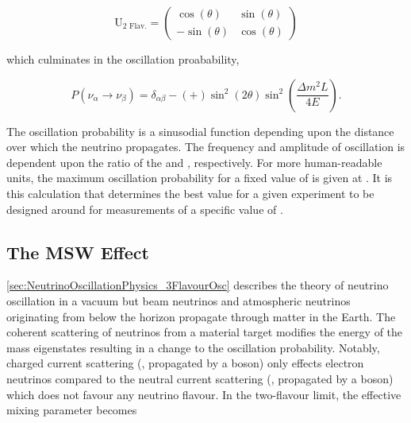 \begin{equation}
  \label{eq:NeutrinoOscillationPhysics_PMNS_2Flavour}
  \mathrm{U_{\text{2 Flav.}}} = \begin{pmatrix} \cos(\theta) & \sin(\theta) \\ -\sin(\theta) & \cos(\theta) \end{pmatrix}
\end{equation}

which culminates in the oscillation proabability,

\begin{equation}
  \label{eq:NeutrinoOscillationPhysics_PMNS_2FlavourOscProb}
  P(\nu_{\alpha} \rightarrow \nu_{\beta}) = \delta_{\alpha \beta} - \left( + \right) \sin^{2} \left( 2\theta \right) \sin^2 \left( \frac{\Delta m^{2} L}{4E} \right).
\end{equation}

The oscillation probability is a sinusodial function depending upon the distance over which the neutrino propagates. The frequency and amplitude of oscillation is dependent upon the ratio of the  and , respectively. For more human-readable units, the maximum oscillation probability for a fixed value of \quickmath{\theta} is given at . It is this calculation that determines the best  value for a given experiment to be designed around for measurements of a specific value of .

\subsection{The MSW Effect}
\label{sec:NeutrinoOscillationPhysics_MSW}

\autoref{sec:NeutrinoOscillationPhysics_3FlavourOsc} describes the theory of neutrino oscillation in a vacuum but beam neutrinos and atmospheric neutrinos originating from below the horizon propagate through matter in the Earth. The coherent scattering of neutrinos from a material target modifies the energy of the mass eigenstates resulting in a change to the oscillation probability. Notably, charged current scattering (, propagated by a  boson) only effects electron neutrinos compared to the neutral current scattering (, propagated by a  boson) which does not favour any neutrino flavour. In the two-flavour limit, the effective mixing parameter becomes

